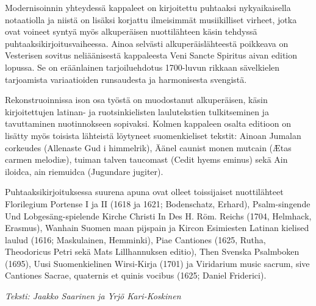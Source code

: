 Modernisoinnin yhteydessä kappaleet on kirjoitettu puhtaaksi nykyaikaisella notaatiolla ja niistä on lisäksi korjattu ilmeisimmät musiikilliset virheet, jotka ovat voineet syntyä myös alkuperäisen nuottilähteen käsin tehdyssä puhtaaksikirjoitusvaiheessa. Ainoa selvästi alkuperäislähteestä poikkeava on Vesterisen sovitus neliäänisestä kappaleesta Veni Sancte Spiritus aivan edition lopussa. Se on eräänlainen tarjoiluehdotus 1700-luvun rikkaan sävelkielen tarjoamista variaatioiden runsaudesta ja harmonisesta svengistä.

Rekonstruoinnissa ison osa työstä on muodostanut alkuperäisen, käsin kirjoitettujen latinan- ja ruotsinkielisten laulutekstien tulkitseminen ja tavuttaminen nuotinnokseen sopivaksi. Kolmen kappaleen osalta editioon on lisätty myös toisista lähteistä löytyneet suomenkieliset tekstit: Ainoan Jumalan corkeudes (Allenaste Gud i himmelrik), Äänel caunist monen mutcain (Ætas carmen melodiæ), tuiman talven taucomast (Cedit hyems eminus) sekä Ain iloidca, ain riemuidca (Jugundare jugiter).

Puhtaaksikirjoituksessa suurena apuna ovat olleet toissijaiset nuottilähteet Florilegium Portense I ja II (1618 ja 1621; Bodenschatz, Erhard), Psalm-singende Und Lobgesäng-spielende Kirche Christi In Des H. Röm. Reichs (1704, Helmhack, Erasmus), Wanhain Suomen maan pijspain ja Kircon Esimiesten Latinan kielised laulud (1616; Maskulainen, Hemminki), Piae Cantiones (1625, Rutha, Theodoricus Petri sekä Mats Lillhannuksen editio), Then Svenska Psalmboken (1695), Uusi Suomenkielinen Wirsi-Kirja (1701) ja Viridarium music sacrum, sive Cantiones Sacrae, quaternis et quinis vocibus (1625; Daniel Friderici).


\textit{Teksti: Jaakko Saarinen ja Yrjö Kari-Koskinen}
